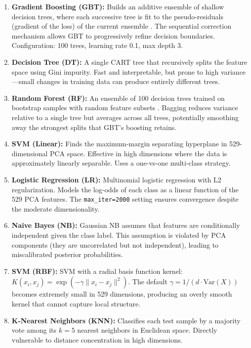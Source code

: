 \documentclass{article}
\begin{document}
\begin{enumerate}[leftmargin=2em]
\item \textbf{Gradient Boosting (GBT):} Builds an additive ensemble of shallow decision trees, where each successive tree is fit to the pseudo-residuals (gradient of the loss) of the current ensemble \citep{friedman2001greedy}. The sequential correction mechanism allows GBT to progressively refine decision boundaries. Configuration: 100 trees, learning rate 0.1, max depth 3.

\item \textbf{Decision Tree (DT):} A single CART tree that recursively splits the feature space using Gini impurity. Fast and interpretable, but prone to high variance---small changes in training data can produce entirely different trees.

\item \textbf{Random Forest (RF):} An ensemble of 100 decision trees trained on bootstrap samples with random feature subsets \citep{breiman2001random}. Bagging reduces variance relative to a single tree but averages across all trees, potentially smoothing away the strongest splits that GBT's boosting retains.

\item \textbf{SVM (Linear):} Finds the maximum-margin separating hyperplane in 529-dimensional PCA space. Effective in high dimensions where the data is approximately linearly separable. Uses a one-vs-one multi-class strategy.

\item \textbf{Logistic Regression (LR):} Multinomial logistic regression with L2 regularization. Models the log-odds of each class as a linear function of the 529 PCA features. The \texttt{max\_iter=2000} setting ensures convergence despite the moderate dimensionality.

\item \textbf{Naive Bayes (NB):} Gaussian NB assumes that features are conditionally independent given the class label. This assumption is violated by PCA components (they are uncorrelated but not independent), leading to miscalibrated posterior probabilities.

\item \textbf{SVM (RBF):} SVM with a radial basis function kernel: $K(x_i, x_j) = \exp(-\gamma \|x_i - x_j\|^2)$. The default $\gamma = 1/(d \cdot \text{Var}(X))$ becomes extremely small in 529 dimensions, producing an overly smooth kernel that cannot capture local structure.

\item \textbf{K-Nearest Neighbors (KNN):} Classifies each test sample by a majority vote among its $k=5$ nearest neighbors in Euclidean space. Directly vulnerable to distance concentration in high dimensions.
\end{enumerate}
\end{document}
